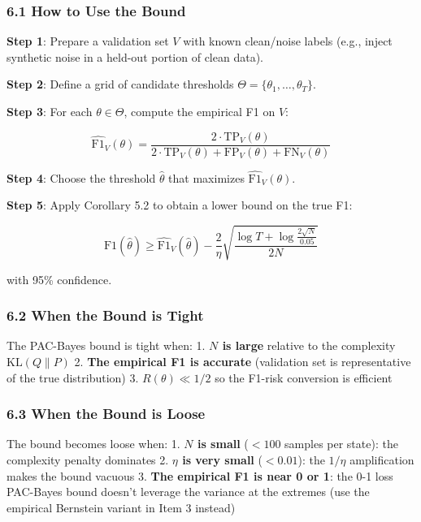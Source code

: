 \documentclass[
  12pt,
]{ctexart}
\begin{document}
\subsubsection{6.1 How to Use the Bound}\label{how-to-use-the-bound}

\textbf{Step 1}: Prepare a validation set \(V\) with known clean/noise
labels (e.g., inject synthetic noise in a held-out portion of clean
data).

\textbf{Step 2}: Define a grid of candidate thresholds
\(\Theta = \{\theta_1, \dots, \theta_T\}\).

\textbf{Step 3}: For each \(\theta \in \Theta\), compute the empirical
F1 on \(V\):

\[\widehat{\text{F1}}_V(\theta) = \frac{2 \cdot \text{TP}_V(\theta)}{2 \cdot \text{TP}_V(\theta) + \text{FP}_V(\theta) + \text{FN}_V(\theta)}\]

\textbf{Step 4}: Choose the threshold \(\hat{\theta}\) that maximizes
\(\widehat{\text{F1}}_V(\theta)\).

\textbf{Step 5}: Apply Corollary 5.2 to obtain a lower bound on the true
F1:

\[\text{F1}(\hat{\theta}) \geq \widehat{\text{F1}}_V(\hat{\theta}) - \frac{2}{\eta}\sqrt{\frac{\log T + \log\frac{2\sqrt{N}}{0.05}}{2N}}\]

with 95\% confidence.

\subsubsection{6.2 When the Bound is
Tight}\label{when-the-bound-is-tight}

The PAC-Bayes bound is tight when: 1. \textbf{\(N\) is large} relative
to the complexity \(\text{KL}(Q\|P)\) 2. \textbf{The empirical F1 is
accurate} (validation set is representative of the true distribution) 3.
\textbf{\(R(\theta) \ll 1/2\)} so the F1-risk conversion is efficient

\subsubsection{6.3 When the Bound is
Loose}\label{when-the-bound-is-loose}

The bound becomes loose when: 1. \textbf{\(N\) is small} (\(< 100\)
samples per state): the complexity penalty dominates 2. \textbf{\(\eta\)
is very small} (\(< 0.01\)): the \(1/\eta\) amplification makes the
bound vacuous 3. \textbf{The empirical F1 is near 0 or 1}: the 0-1 loss
PAC-Bayes bound doesn't leverage the variance at the extremes (use the
empirical Bernstein variant in Item 3 instead)
\end{document}
